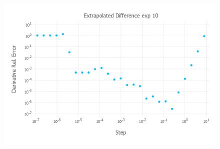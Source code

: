 \documentclass{article}
\begin{document}
\begin{figure}[H]
	\includegraphics[width=6in,height=4in]{"extrap exp 10"}
\end{figure}
\end{document}
